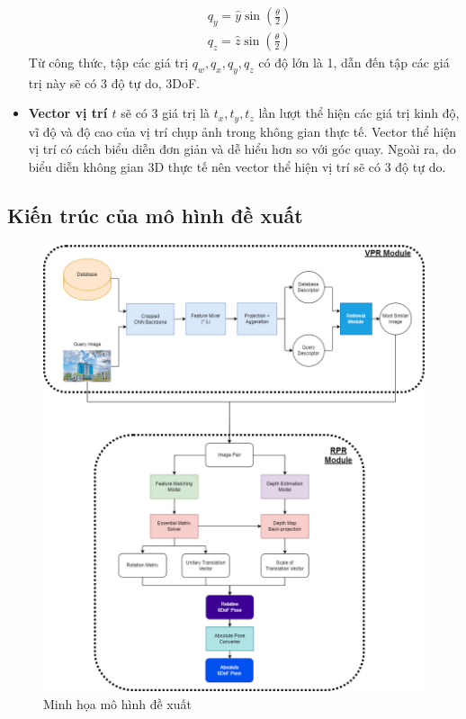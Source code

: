 \begin{itemize}
$$\begin{aligned}
        & q_y=\hat{y} \sin \left(\frac{\theta}{2}\right) \\
        & q_z=\hat{z} \sin \left(\frac{\theta}{2}\right)
    \end{aligned}
    $$
    Từ công thức, tập các giá trị $q_w, q_x, q_y, q_z$ có độ lớn là 1, dẫn đến tập các giá trị này sẽ có 3 độ tự do, 3DoF.
    \item \textbf{Vector vị trí $t$} sẽ có 3 giá trị là $t_x,t_y,t_z$ lần lượt thể hiện các giá trị kinh độ, vĩ độ và độ cao của vị trí chụp ảnh trong không gian thực tế. Vector thể hiện vị trí có cách biểu diễn đơn giản và dễ hiểu hơn so với góc quay. Ngoài ra, do biểu diễn không gian 3D thực tế nên vector thể hiện vị trí sẽ có 3 độ tự do.
\end{itemize}

\subsection{Kiến trúc của mô hình đề xuất}
\begin{figure}[H]
    \centering
    \includegraphics[scale=0.4]{pics/Proposal/models.png}
    \caption{Minh họa mô hình đề xuất}
\end{figure}

